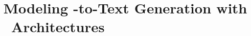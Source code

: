 \section{Modeling \MeaningRepresentation-to-Text Generation with \SequencetoSequence~Architectures}
\label{mrtproblemdef}


